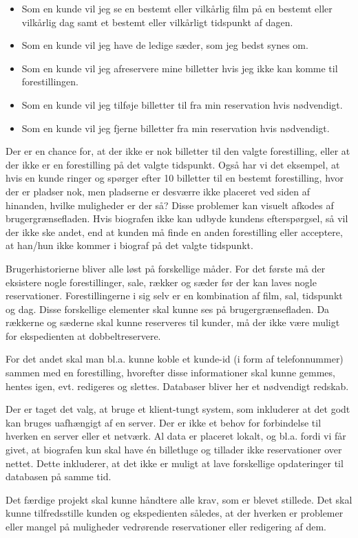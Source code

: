 \begin{itemize}
  \item Som en kunde vil jeg se en bestemt eller vilkårlig film på en bestemt eller vilkårlig dag samt et bestemt eller vilkårligt tidspunkt af dagen.
  \item Som en kunde vil jeg have de ledige sæder, som jeg bedst synes om.
  \item Som en kunde vil jeg afreservere mine billetter hvis jeg ikke kan komme til forestillingen.
  \item Som en kunde vil jeg tilføje billetter til fra min reservation hvis nødvendigt.
  \item Som en kunde vil jeg fjerne billetter fra min reservation hvis nødvendigt.
\end{itemize}

Der er en chance for, at der ikke er nok billetter til den valgte forestilling, eller at der ikke er en forestilling på det valgte tidspunkt. Også har vi det eksempel, at hvis en kunde ringer og spørger efter 10 billetter til en bestemt forestilling, hvor der er pladser nok, men pladserne er desværre ikke placeret ved siden af hinanden, hvilke muligheder er der så? Disse problemer kan visuelt afkodes af brugergrænsefladen. Hvis biografen ikke kan udbyde kundens efterspørgsel, så vil der ikke ske andet, end at kunden må finde en anden forestilling eller acceptere, at han/hun ikke kommer i biograf på det valgte tidspunkt.

Brugerhistorierne bliver alle løst på forskellige måder. For det første må der eksistere nogle forestillinger, sale, rækker og sæder før der kan laves nogle reservationer. Forestillingerne i sig selv er en kombination af film, sal, tidspunkt og dag. Disse forskellige elementer skal kunne ses på brugergrænsefladen. Da rækkerne og sæderne skal kunne reserveres til kunder, må der ikke være muligt for ekspedienten at dobbeltreservere.

For det andet skal man bl.a. kunne koble et kunde-id (i form af telefonnummer) sammen med en forestilling, hvorefter disse informationer skal kunne gemmes, hentes igen, evt. redigeres og slettes. Databaser bliver her et nødvendigt redskab.

Der er taget det valg, at bruge et klient-tungt system, som inkluderer at det godt kan bruges uafhængigt af en server. Der er ikke et behov for forbindelse til hverken en server eller et netværk. Al data er placeret lokalt, og bl.a. fordi vi får givet, at biografen kun skal have én billetluge og tillader ikke reservationer over nettet. Dette inkluderer, at det ikke er muligt at lave forskellige opdateringer til databasen på samme tid.

Det færdige projekt skal kunne håndtere alle krav, som er blevet stillede. Det skal kunne tilfredsstille kunden og ekspedienten således, at der hverken er problemer eller mangel på muligheder vedrørende reservationer eller redigering af dem.

